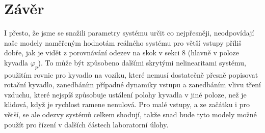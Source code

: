 \documentclass[a4paper,12pt]{article}
\begin{document}
\section{Závěr}
I přesto, že jsme se snažili parametry systému určit co nejpřesněji, neodpovídají naše modely naměřeným hodnotám reálného systému pro větší vstupy příliš dobře, jak je vidět z porovnávání odezev na skok v sekci 8 (hlavně v poloze kyvadla $\varphi_p$). To může být způsobeno dalšími skrytými nelinearitami systému, použitím rovnic pro kyvadlo na vozíku, které nemusí dostatečně přesně popisovat rotační kyvadlo, zanedbáním případné dynamiky vstupu a zanedbáním vlivu tření vzduchu, které nejspíš způsobuje ustálení polohy kyvadla v jiné poloze, než je klidová, když je rychlost ramene nenulová.
\newline
Pro malé vstupy, a ze začátku i pro větší, se ale odezvy systémů celkem shodují, takže snad bude tyto modely možné použít pro řízení v dalších částech laboratorní úlohy.
\end{document}
